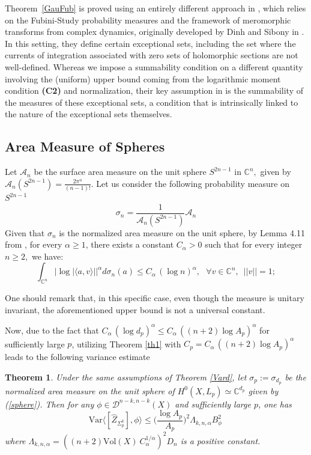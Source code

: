 \documentclass[11pt,leqno,oneside]{amsart}
\newtheorem{thm}{Theorem}[section]
\numberwithin{equation}{section}
\begin{document}
Theorem~\ref{GauFub} is proved using an entirely different approach in \cite[Theorem 0.4]{CLMM}, which relies on the Fubini-Study probability measures and the framework of meromorphic transforms from complex dynamics, originally developed by Dinh and Sibony in \cite{DS06}. In this setting, they define certain exceptional sets, including the set where the currents of integration associated with zero sets of holomorphic sections are not well-defined. Whereas we impose a summability condition on a different quantity involving the (uniform) upper bound coming from the logarithmic moment condition \textbf{(C2)} and normalization, their key assumption in \cite[Theorem 0.4]{CLMM} is the summability of the measures of these exceptional sets, a condition that is intrinsically linked to the nature of the exceptional sets themselves.

\subsection{Area Measure of Spheres} Let $\mathcal{A}_{n}$ be the surface area measure on the unit sphere $S^{2n-1}$ in $\mathbb{C}^{n},$ given by $\mathcal{A}_{n}(S^{2n-1})=\frac{2\pi^{n}}{(n-1)!}.$ Let us consider the following probability measure on $S^{2n-1}$
\begin{equation}\label{sphere}
	\sigma_{n}=\frac{1}{\mathcal{A}_{n}(S^{2n-1})}\mathcal{A}_{n}
\end{equation}
 Given that  $\sigma_{n}$ is the normalized area measure on the unit sphere, by Lemma 4.11 from \cite{BCM}, for every $\alpha \geq 1$, there exists a constant $C_{\alpha}>0$ such that for every integer $n\geq2,$ we have: \begin{equation}\int_{\mathbb{C}^{n}}{|\log{|\langle a, v \rangle|}|}^{\alpha}d\sigma_{n}(a)\leq C_{\alpha}\,(\log n)^{\alpha}, \,\,\,\,\forall v\in \mathbb{C}^{n},\,\,\,||v||=1;\end{equation}


One should remark that, in this specific case, even though the measure is unitary invariant, the aforementioned upper bound is not a universal constant.

Now, due to the fact  that $C_{\alpha}\,(\log d_{p})^{\alpha}\leq C_{\alpha} \,((n+2)\log A_{p})^{\alpha}$ for sufficiently large $p$, utilizing Theorem \ref{th1} with $C_{p}=C_{\alpha} \,((n+2)\log A_{p})^{\alpha}$ leads to the following variance estimate

\begin{thm} Under the same assumptions of Theorem \ref{Vard}, let $\sigma_{p}:=\sigma_{d_{p}}$ be the normalized area measure on the unit sphere of  $H^{0}(X, L_{p})\simeq \mathbb{C}^{d_{p}} $ given by (\ref{sphere}). Then for any  $\phi\in \mathcal{D}^{n-k, n-k}(X)$ and sufficiently large $p$, one has 
\begin{equation}
		\mathrm{Var}\langle [\widehat{Z}_{\Sigma_{p}^{k}}], \phi \rangle   \leq \Big(\frac{\log{A_{p}}}{A_{p}}\Big)^{2} \Lambda_{k,n,\alpha} B_{\phi}^{2}\,
\end{equation}
where  $\Lambda_{k,n,\alpha}=((n+2)\mathrm{Vol}(X)\ C_{\alpha}^{1/\alpha})^{2} D_n$ is a positive constant. \end{thm}
\end{document}
